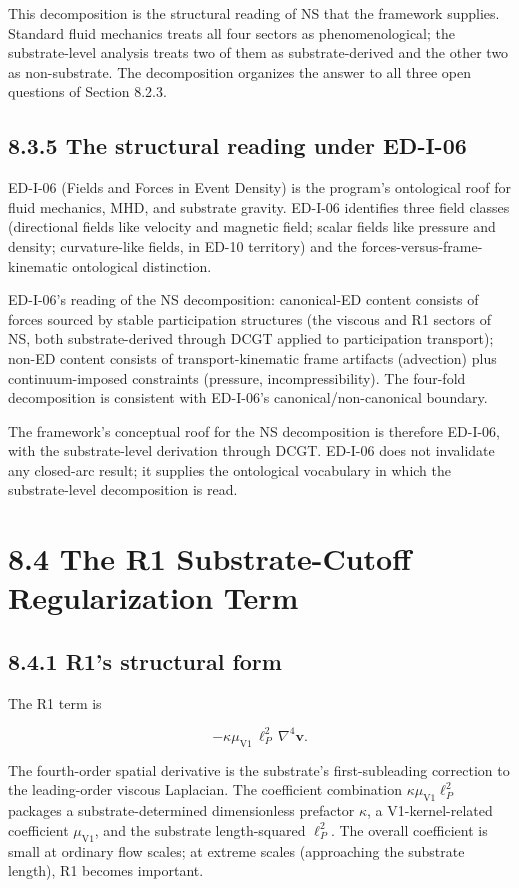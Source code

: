 \documentclass[11pt]{book}
\begin{document}
This decomposition is the structural reading of NS that the framework supplies. Standard fluid mechanics treats all four sectors as phenomenological; the substrate-level analysis treats two of them as substrate-derived and the other two as non-substrate. The decomposition organizes the answer to all three open questions of Section 8.2.3.

\subsection{8.3.5 The structural reading under ED-I-06}

ED-I-06 (Fields and Forces in Event Density) is the program's ontological roof for fluid mechanics, MHD, and substrate gravity. ED-I-06 identifies three field classes (directional fields like velocity and magnetic field; scalar fields like pressure and density; curvature-like fields, in ED-10 territory) and the forces-versus-frame-kinematic ontological distinction.

ED-I-06's reading of the NS decomposition: canonical-ED content consists of forces sourced by stable participation structures (the viscous and R1 sectors of NS, both substrate-derived through DCGT applied to participation transport); non-ED content consists of transport-kinematic frame artifacts (advection) plus continuum-imposed constraints (pressure, incompressibility). The four-fold decomposition is consistent with ED-I-06's canonical/non-canonical boundary.

The framework's conceptual roof for the NS decomposition is therefore ED-I-06, with the substrate-level derivation through DCGT. ED-I-06 does not invalidate any closed-arc result; it supplies the ontological vocabulary in which the substrate-level decomposition is read.

\section{8.4 The R1 Substrate-Cutoff Regularization Term}

\subsection{8.4.1 R1's structural form}

The R1 term is

\[
-\kappa\mu_{\mathrm{V1}}\,\ell_P^2\,\nabla^4\mathbf{v}.
\]

The fourth-order spatial derivative is the substrate's first-subleading correction to the leading-order viscous Laplacian. The coefficient combination $\kappa\mu_{\mathrm{V1}}\ell_P^2$ packages a substrate-determined dimensionless prefactor $\kappa$, a V1-kernel-related coefficient $\mu_{\mathrm{V1}}$, and the substrate length-squared $\ell_P^2$. The overall coefficient is small at ordinary flow scales; at extreme scales (approaching the substrate length), R1 becomes important.
\end{document}
